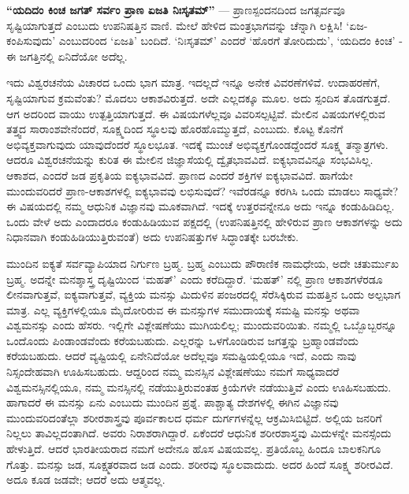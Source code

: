 \textbf{“ಯದಿದಂ ಕಿಂಚ ಜಗತ್​ ಸರ್ವಂ ಪ್ರಾಣ ಏಜತಿ ನಿಃಸೃತಮ್​”} — ಪ್ರಾಣಸ್ಪಂದನದಿಂದ ಜಗತ್ಸರ್ವವೂ ಸೃಷ್ಟಿಯಾಗುತ್ತದೆ ಎಂಬುದು ಉಪನಿಷತ್ತಿನ ವಾಣಿ. ಮೇಲೆ ಹೇಳಿದ ಮಂತ್ರಭಾಗವನ್ನು ಚೆನ್ನಾಗಿ ಲಕ್ಷಿಸಿ! ‘ಏಜ-ಕಂಪಿಸುವುದು’ ಎಂಬುದರಿಂದ ‘ಏಜತಿ’ ಬಂದಿದೆ. ‘ನಿಃಸೃತಮ್​’ ಎಂದರೆ ‘ಹೊರಗೆ ತೋರಿದುದು’, ‘ಯದಿದಂ ಕಿಂಚ’ - ಈ ಜಗತ್ತಿನಲ್ಲಿ ಏನಿದೆಯೋ ಅದೆಲ್ಲ.

ಇದು ವಿಶ್ವರಚನೆಯ ವಿಚಾರದ ಒಂದು ಭಾಗ ಮಾತ್ರ. ಇದಲ್ಲದೆ ಇನ್ನೂ ಅನೇಕ ವಿವರಣೆಗಳಿವೆ. ಉದಾಹರಣೆಗೆ, ಸೃಷ್ಟಿಯಾಗುವ ಕ್ರಮವೆಂತು? ಮೊದಲು ಆಕಾಶವಿರುತ್ತದೆ. ಅದೇ ಎಲ್ಲದಕ್ಕೂ ಮೂಲ. ಅದು ಸ್ಪಂದಿಸ ತೊಡಗುತ್ತದೆ. ಆಗ ಅದರಿಂದ ವಾಯು ಉತ್ಪತ್ತಿಯಾಗುತ್ತದೆ. ಈ ವಿಷಯಗಳೆಲ್ಲವೂ ವಿವರಿಸಲ್ಪಟ್ಟಿವೆ. ಮೇಲಿನ ವಿಷಯಗಳಲ್ಲಿರುವ ತತ್ತ್ವದ ಸಾರಾಂಶವೇನೆಂದರೆ, ಸೂಕ್ಷ್ಮದಿಂದ ಸ್ಥೂಲವು ಹೊರಹೊಮ್ಮುತ್ತದೆ, ಎಂಬುದು. ಕೊಟ್ಟ ಕೊನೆಗೆ ಅಭಿವ್ಯಕ್ತವಾಗುವುದು ಯಾವುದೆಂದರೆ ಸ್ಥೂಲಭೂತ. ಇದಕ್ಕೆ ಮುಂಚೆ ಅಭಿವ್ಯಕ್ತಗೊಂಡದ್ದೆಂದರೆ ಸೂಕ್ಷ್ಮ ತನ್ಮಾತ್ರಗಳು. ಆದರೂ ವಿಶ್ವರಚನೆಯನ್ನು ಕುರಿತ ಈ ಮೇಲಿನ ಜಿಜ್ಞಾಸೆಯಲ್ಲಿ ದ್ವೈತಭಾವವಿದೆ. ಐಕ್ಯಭಾವವಿನ್ನೂ ಸಂಭವಿಸಿಲ್ಲ. ಆಕಾಶದ, ಎಂದರೆ ಜಡ ಪ್ರಕೃತಿಯ ಐಕ್ಯಭಾವವಿದೆ. ಪ್ರಾಣದ ಎಂದರೆ ಶಕ್ತಿಗಳ ಐಕ್ಯಭಾವವಿದೆ. ಹಾಗೆಯೇ ಮುಂದುವರಿದರೆ ಪ್ರಾಣ-ಆಕಾಶಗಳಲ್ಲಿ ಐಕ್ಯಭಾವವು ಲಭಿಸುವುದೆ? ಇವೆರಡನ್ನೂ ಕರಗಿಸಿ ಒಂದು ಮಾಡಲು ಸಾಧ್ಯವೇ? ಈ ವಿಷಯದಲ್ಲಿ ನಮ್ಮ ಆಧುನಿಕ ವಿಜ್ಞಾನವು ಮೂಕವಾಗಿದೆ. ಇದಕ್ಕೆ ಉತ್ತರವನ್ನೇನೂ ಅದು ಇನ್ನೂ ಕಂಡುಹಿಡಿದಿಲ್ಲ. ಒಂದು ವೇಳೆ ಅದು ಎಂದಾದರೂ ಕಂಡುಹಿಡಿಯುವ ಪಕ್ಷದಲ್ಲಿ (ಉಪನಿಷತ್ತಿನಲ್ಲಿ ಹೇಳಿರುವ ಪ್ರಾಣ ಆಕಾಶಗಳನ್ನು ಅದು ನಿಧಾನವಾಗಿ ಕಂಡುಹಿಡಿಯುತ್ತಿರುವಂತೆ) ಅದು ಉಪನಿಷತ್ತುಗಳ ಸಿದ್ಧಾಂತಕ್ಕೇ ಬರಬೇಕು.

ಮುಂದಿನ ಐಕ್ಯತೆ ಸರ್ವವ್ಯಾಪಿಯಾದ ನಿರ್ಗುಣ ಬ್ರಹ್ಮ. ಬ್ರಹ್ಮ ಎಂಬುದು ಪೌರಾಣಿಕ ನಾಮಧೇಯ, ಅದೇ ಚತುರ್ಮುಖ ಬ್ರಹ್ಮ. ಅದನ್ನೇ ಮನಶ್ಶಾಸ್ತ್ರ ದೃಷ್ಟಿಯಿಂದ ‘ಮಹತ್​’ ಎಂದು ಕರೆದಿದ್ದಾರೆ. ‘ಮಹತ್​’ ನಲ್ಲಿ ಪ್ರಾಣ ಆಕಾಶಗಳೆರಡೂ ಲೀನವಾಗುತ್ತವೆ, ಐಕ್ಯವಾಗುತ್ತವೆ, ವ್ಯಕ್ತಿಯ ಮನಸ್ಸು ಮಿದುಳಿನ ಪಂಜರದಲ್ಲಿ ಸೆರೆಸಿಕ್ಕಿರುವ ಮಹತ್ತಿನ ಒಂದು ಅಲ್ಪಭಾಗ ಮಾತ್ರ. ಎಲ್ಲ ವ್ಯಕ್ತಿಗಳಲ್ಲಿಯೂ ಮೈದೋರಿರುವ ಈ ಮನಸ್ಸುಗಳ ಸಮುದಾಯಕ್ಕೆ ಸಮಷ್ಟಿ ಮನಸ್ಸು ಅಥವಾ ವಿಶ್ವಮನಸ್ಸು ಎಂದು ಹೆಸರು. ಇಲ್ಲಿಗೇ ವಿಶ್ಲೇಷಣೆಯು ಮುಗಿಯಲಿಲ್ಲ; ಮುಂದುವರಿಯಿತು. ನಮ್ಮಲ್ಲಿ ಒಬ್ಬೊಬ್ಬರನ್ನೂ ಒಂದೊಂದು ಪಿಂಡಾಂಡವೆಂದು ಕರೆಯಬಹುದು. ಎಲ್ಲರನ್ನು ಒಳಗೊಂಡಿರುವ ಜಗತ್ತನ್ನು ಬ್ರಹ್ಮಾಂಡವೆಂದು ಕರೆಯಬಹುದು. ಆದರೆ ವ್ಯಷ್ಟಿಯಲ್ಲಿ ಏನೇನಿದೆಯೋ ಅದೆಲ್ಲವೂ ಸಮಷ್ಟಿಯಲ್ಲಿಯೂ ಇದೆ, ಎಂದು ನಾವು ನಿಸ್ಸಂದೇಹವಾಗಿ ಊಹಿಸಬಹುದು. ಆದ್ದರಿಂದ ನಮ್ಮ ಮನಸ್ಸಿನ ವಿಶ್ಲೇಷಣೆಯು ನಮಗೆ ಸಾಧ್ಯವಾದರೆ ವಿಶ್ವಮನಸ್ಸಿನಲ್ಲಿಯೂ, ನಮ್ಮ ಮನಸ್ಸಿನಲ್ಲಿ ನಡೆಯುತ್ತಿರುವಂತಹ ಕ್ರಿಯೆಗಳೇ ನಡೆಯುತ್ತಿವೆ ಎಂದು ಊಹಿಸಬಹುದು. ಹಾಗಾದರೆ ಈ ಮನಸ್ಸು ಏನು ಎಂಬುದು ಮುಂದಿನ ಪ್ರಶ್ನೆ. ಪಾಶ್ಚಾತ್ಯ ದೇಶಗಳಲ್ಲಿ ಈಗಿನ ವಿಜ್ಞಾನವು ಮುಂದುವರಿದಂತೆಲ್ಲಾ ಶರೀರಶಾಸ್ತ್ರವು ಪೂರ್ವಕಾಲದ ಧರ್ಮ ದುರ್ಗಗಳನ್ನೆಲ್ಲ ಆಕ್ರಮಿಸಿಬಿಟ್ಟಿದೆ. ಅಲ್ಲಿಯ ಜನರಿಗೆ ನಿಲ್ಲಲು ತಾವಿಲ್ಲದಂತಾಗಿದೆ. ಅವರು ನಿರಾಶರಾಗಿದ್ದಾರೆ. ಏಕೆಂದರೆ ಆಧುನಿಕ ಶರೀರಶಾಸ್ತ್ರವು ಮಿದುಳನ್ನೇ ಮನಸ್ಸೆಂದು ಹೇಳುತ್ತಿದೆ. ಆದರೆ ಭಾರತೀಯರಾದ ನಮಗೆ ಅದೇನೂ ಹೊಸ ವಿಷಯವಲ್ಲ. ಪ್ರತಿಯೊಬ್ಬ ಹಿಂದೂ ಬಾಲಕನಿಗೂ ಗೊತ್ತು. ಮನಸ್ಸು ಜಡ, ಸೂಕ್ಷ್ಮತರವಾದ ಜಡ ಎಂದು. ಶರೀರವು ಸ್ಥೂಲವಾದುದು. ಅದರ ಹಿಂದೆ ಸೂಕ್ಷ್ಮ ಶರೀರವಿದೆ. ಅದೂ ಕೂಡ ಜಡವೇ; ಆದರೆ ಅದು ಆತ್ಮವಲ್ಲ.

